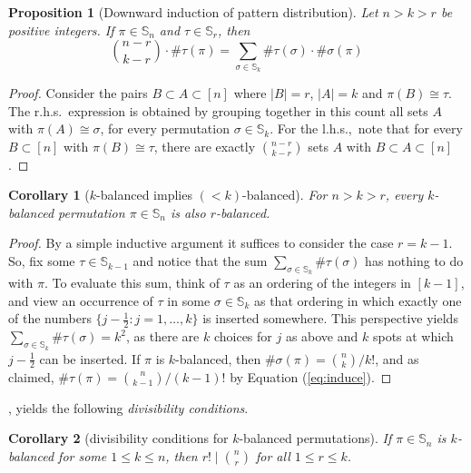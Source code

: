 \documentclass{article}
\newtheorem{corollary}{Corollary}[theorem]
\newtheorem{proposition}[theorem]{Proposition}
\newcommand{\Sn}{\mathbb{S}_n}
\newcommand{\pc}[2]{{\# \mathtt{ #1 } \left( #2 \right)}}
\theoremstyle{remark}
\theoremstyle{plain}
\begin{document}
\begin{proposition}[Downward induction of pattern distribution]
\label{prop:down_ind_k_prof}
Let $n>k>r$ be positive integers. If $\pi \in \Sn$ and $\tau \in \mathbb{S}_{r}$, then
\begin{equation}\label{eq:induce}
        \binom{n-r}{k-r} \cdot \pc{\tau}{\pi} = \sum_{\sigma \in \mathbb{S}_k} \pc{\tau}{\sigma} \cdot \pc{\sigma}{\pi}
\end{equation}
\end{proposition}
\begin{proof}
Consider the pairs $B\subset A\subset [n]$ where $|B|=r$, $|A|=k$ and $\pi(B) \cong \tau$.
The r.h.s.\ expression is obtained by
grouping together in this count all sets $A$ with $\pi(A) \cong \sigma$,
for every permutation $\sigma\in \mathbb{S}_{k}$.
For the l.h.s.,\ note that for every $B\subset [n]$ with $\pi(B) \cong \tau$,
there are exactly $\binom{n-r}{k-r}$ sets $A$ with $B\subset A\subset [n]$.
\end{proof}

\begin{corollary}[$k$-balanced implies $(<k)$-balanced]
    \label{cor:k_bal_implies_lt_k_bal}
For $n>k>r$, every $k$-balanced permutation $\pi \in \Sn$ is also $r$-balanced.
\end{corollary}
\begin{proof}
By a simple inductive argument it suffices to consider the case $r=k-1$. So,
fix some $\tau\in \mathbb{S}_{k-1}$ and notice that the sum 
$\sum_{\sigma \in \mathbb{S}_k} \pc{\tau}{\sigma}$
has nothing to do with $\pi$. To evaluate this sum, think of $\tau$
as an ordering of the integers in $[k-1]$, and view an occurrence of $\tau$
in some $\sigma \in \mathbb{S}_k$ as that ordering in which exactly one of the numbers
$\{j-\frac 12 : j=1,\ldots,k\}$ is inserted somewhere. This perspective yields 
$\sum_{\sigma \in \mathbb{S}_k} \pc{\tau}{\sigma}=k^2$, as there are $k$ choices
for $j$ as above and $k$ spots at which $j-\frac 12$ can be inserted.
If $\pi$ is $k$-balanced, then $\pc{\sigma}{\pi}=\binom{n}{k}/{k!}$,
and as claimed, $\pc{\tau}{\pi}=\binom{n}{k-1}/{(k-1)!}$ by
 Equation (\ref{eq:induce}).
\end{proof}

, yields the following \emph{divisibility conditions}.

\begin{corollary}[divisibility conditions for $k$-balanced permutations]
    \label{cor:div_conds}
    If $\pi \in \Sn$ is $k$-balanced for some $1 \leq k \le n$, then $r! \mid \binom{n}{r}$ for all $1 \leq r \le k$.
\end{corollary}
\end{document}
